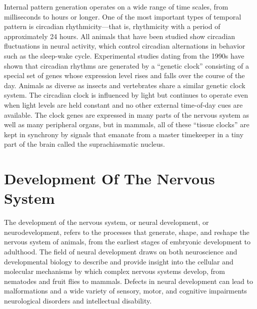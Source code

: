 Internal pattern generation operates on a wide range of time scales, from milliseconds to hours or longer. One of the most important types of temporal pattern is circadian rhythmicity---that is, rhythmicity with a period of approximately 24 hours. All animals that have been studied show circadian fluctuations in neural activity, which control circadian alternations in behavior such as the sleep-wake cycle. Experimental studies dating from the 1990s have shown that circadian rhythms are generated by a ``genetic clock'' consisting of a special set of genes whose expression level rises and falls over the course of the day. Animals as diverse as insects and vertebrates share a similar genetic clock system. The circadian clock is influenced by light but continues to operate even when light levels are held constant and no other external time-of-day cues are available. The clock genes are expressed in many parts of the nervous system as well as many peripheral organs, but in mammals, all of these ``tissue clocks'' are kept in synchrony by signals that emanate from a master timekeeper in a tiny part of the brain called the suprachiasmatic nucleus.

\hypertarget{development-of-the-nervous-system-1}{%
\chapter{Development Of The Nervous System}\label{development-of-the-nervous-system-1}}

The development of the nervous system, or neural development, or neurodevelopment, refers to the processes that generate, shape, and reshape the nervous system of animals, from the earliest stages of embryonic development to adulthood. The field of neural development draws on both neuroscience and developmental biology to describe and provide insight into the cellular and molecular mechanisms by which complex nervous systems develop, from nematodes and fruit flies to mammals. Defects in neural development can lead to malformations and a wide variety of sensory, motor, and cognitive impairments neurological disorders and intellectual disability.

